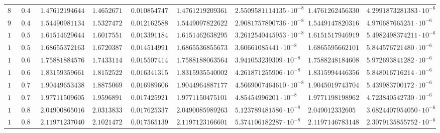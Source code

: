 \begin{table}[h!]
\begin{tabular}{|l|l|l|l|l|l|l|l|l|}
		$  8 $ & $                 0.40 $ & $     1.476121946445 $ & $  1.4652671 $ & $  0.0108547471 $ & $ 1.47612192093614 $ & $ 2.5509581114135 \cdot 10^{-8} $ & $ 1.47612624563305 $     & $ 4.2991873281383\cdot 10^{-6} $ \\
		$  9 $ & $                0.45 $  & $     1.544909811344 $ & $ 1.53274722 $ & $  0.0121625888 $ & $ 1.54490978226225 $ & $ 2.9081757890736 \cdot 10^{-8} $ & $ 1.54491478203167 $     & $  4.970687665251\cdot 10^{-6} $ \\
		$ 10 $ & $                 0.50 $ & $     1.615146296442 $ & $ 1.60175511 $ & $  0.0133911842 $ & $ 1.61514626382954 $ & $ 3.2612540445953 \cdot 10^{-8} $ & $ 1.61515179469192 $     & $ 5.4982498374211\cdot 10^{-6} $ \\
		$ 11 $ & $                0.55 $  & $     1.686553721633 $ & $ 1.67203872 $ & $  0.0145149916 $ & $ 1.68655368556730 $ & $   3.60661085441 \cdot 10^{-8} $ & $ 1.68655956621013 $     & $  5.844576721480\cdot 10^{-6} $ \\
		$ 12 $ & $                 0.60 $ & $     1.758818845766 $ & $ 1.74331143 $ & $  0.0155074148 $ & $ 1.75881880635646 $ & $  3.941053239309 \cdot 10^{-8} $ & $ 1.75882481846083 $     & $  5.972693841282\cdot 10^{-6} $ \\
		$ 13 $ & $                0.65 $  & $      1.83159359661 $ & $ 1.81525228 $ & $  0.0163413151 $ & $ 1.83159355400025 $ & $  4.261871255906 \cdot 10^{-8} $ & $ 1.83159944463568 $     & $  5.848016716214\cdot 10^{-6} $ \\
		$ 14 $ & $                 0.70 $ & $     1.904496534386 $ & $  1.8875069 $ & $  0.0169896063 $ & $  1.9044964887177 $ & $ 4.5669007464610 \cdot 10^{-8} $ & $ 1.90450197437043 $     & $  5.439983700172\cdot 10^{-6} $ \\
		$ 15 $ & $                0.75 $  & $      1.97711509605 $ & $ 1.95968917 $ & $  0.0174259216 $ & $ 1.97711504751018 $ & $   4.85454996201 \cdot 10^{-8} $ & $ 1.97711981989622 $     & $  4.723840542730\cdot 10^{-6} $ \\
		$ 16 $ & $                 0.80 $ & $     2.049008650164 $ & $  2.0313833 $ & $  0.0176253379 $ & $ 2.04900859892637 $ & $  5.123789481586 \cdot 10^{-8} $ & $   2.049012332605 $     & $ 3.6824407954050\cdot 10^{-6} $ \\
		$ 17 $ & $                0.85 $  & $      2.11971237040 $ & $ 2.10214723 $ & $  0.0175651390 $ & $  2.1197123166601 $ & $  5.374106182287 \cdot 10^{-8} $ & $ 2.11971467831483 $     & $ 2.3079135855752\cdot 10^{-6} $ \\

\end{tabular}
\end{table}
